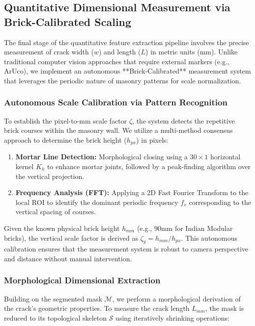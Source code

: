 \subsection{Quantitative Dimensional Measurement via Brick-Calibrated Scaling}
\label{sec:crack_dimensions}

\begin{sloppypar}
The final stage of the quantitative feature extraction pipeline involves the precise measurement of crack width ($w$) and length ($L$) in metric units (mm). Unlike traditional computer vision approaches that require external markers (e.g., ArUco), we implement an autonomous **Brick-Calibrated** measurement system that leverages the periodic nature of masonry patterns for scale normalization.
\end{sloppypar}

\subsubsection{Autonomous Scale Calibration via Pattern Recognition}
\begin{sloppypar}
To establish the pixel-to-mm scale factor $\zeta$, the system detects the repetitive brick courses within the masonry wall. We utilize a multi-method consensus approach to determine the brick height ($h_{px}$) in pixels:
\end{sloppypar}

\begin{enumerate}[noitemsep]
    \item \textbf{Mortar Line Detection:} Morphological closing using a $30 \times 1$ horizontal kernel $K_h$ to enhance mortar joints, followed by a peak-finding algorithm over the vertical projection.
    \item \textbf{Frequency Analysis (FFT):} Applying a 2D Fast Fourier Transform to the local ROI to identify the dominant periodic frequency $f_v$ corresponding to the vertical spacing of courses.
\end{enumerate}

\noindent Given the known physical brick height $h_{mm}$ (e.g., 90mm for Indian Modular bricks), the vertical scale factor is derived as $\zeta_y = h_{mm} / h_{px}$. This autonomous calibration ensures that the measurement system is robust to camera perspective and distance without manual intervention.

\subsubsection{Morphological Dimensional Extraction}
\begin{sloppypar}
Building on the segmented mask $\mathcal{M}$, we perform a morphological derivation of the crack's geometric properties. To measure the crack length $L_{mm}$, the mask is reduced to its topological skeleton $\mathcal{S}$ using iteratively shrinking operations:
\end{sloppypar}

